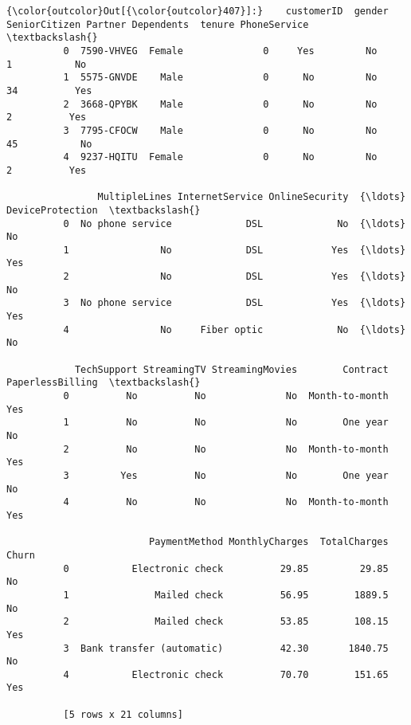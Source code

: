 \documentclass[11pt]{article}
\begin{document}
\begin{Verbatim}[commandchars=\\\{\}]
{\color{outcolor}Out[{\color{outcolor}407}]:}    customerID  gender  SeniorCitizen Partner Dependents  tenure PhoneService  \textbackslash{}
          0  7590-VHVEG  Female              0     Yes         No       1           No   
          1  5575-GNVDE    Male              0      No         No      34          Yes   
          2  3668-QPYBK    Male              0      No         No       2          Yes   
          3  7795-CFOCW    Male              0      No         No      45           No   
          4  9237-HQITU  Female              0      No         No       2          Yes   
          
                MultipleLines InternetService OnlineSecurity  {\ldots}  DeviceProtection  \textbackslash{}
          0  No phone service             DSL             No  {\ldots}                No   
          1                No             DSL            Yes  {\ldots}               Yes   
          2                No             DSL            Yes  {\ldots}                No   
          3  No phone service             DSL            Yes  {\ldots}               Yes   
          4                No     Fiber optic             No  {\ldots}                No   
          
            TechSupport StreamingTV StreamingMovies        Contract PaperlessBilling  \textbackslash{}
          0          No          No              No  Month-to-month              Yes   
          1          No          No              No        One year               No   
          2          No          No              No  Month-to-month              Yes   
          3         Yes          No              No        One year               No   
          4          No          No              No  Month-to-month              Yes   
          
                         PaymentMethod MonthlyCharges  TotalCharges Churn  
          0           Electronic check          29.85         29.85    No  
          1               Mailed check          56.95        1889.5    No  
          2               Mailed check          53.85        108.15   Yes  
          3  Bank transfer (automatic)          42.30       1840.75    No  
          4           Electronic check          70.70        151.65   Yes  
          
          [5 rows x 21 columns]
\end{Verbatim}
            
\end{document}

